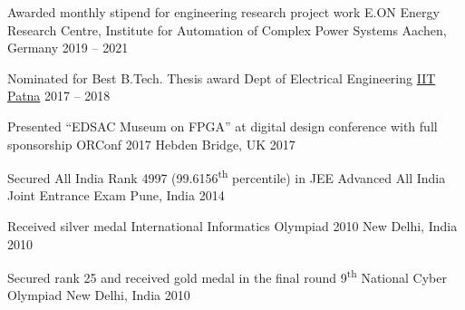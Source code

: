 \begin{cvhonours}

\cvhonour
	{Awarded monthly stipend for engineering research project work} %
	{E.ON Energy Research Centre, Institute for Automation of Complex Power Systems} %
	{Aachen, Germany} %
	{2019 -- 2021} %

\cvhonour
	{Nominated for Best B.Tech. Thesis award} %
	{Dept of Electrical Engineering} %
	{\href{https://www.iitp.ac.in}{IIT Patna}} %
	{2017 -- 2018} %

\cvhonour
	{Presented ``EDSAC Museum on FPGA'' at digital design conference with full sponsorship} %
	{ORConf 2017} %
	{Hebden Bridge, UK} %
	{2017} %

\cvhonour
	{Secured All India Rank 4997 (99.6156\textsuperscript{th} percentile) in JEE Advanced} %
	{All India Joint Entrance Exam} %
	{Pune, India} %
	{2014} %

\cvhonour
	{Received silver medal} %
	{International Informatics Olympiad 2010} %
	{New Delhi, India} %
	{2010} %

\cvhonour
	{Secured rank 25 and received gold medal in the final round} %
	{9\textsuperscript{th} National Cyber Olympiad} %
	{New Delhi, India} %
	{2010} %



\end{cvhonours}